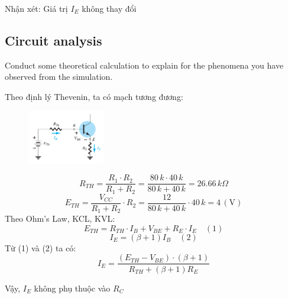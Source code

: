 Nhận xét: Giá trị $I_E$ không thay đổi
\subsection{Circuit analysis}
Conduct some theoretical calculation to explain for the phenomena you have observed
from the simulation.

Theo định lý Thevenin, ta có mạch tương đương:
\begin{figure}[h]
    \centering
    \includegraphics[width=0.3\textwidth]{graphics/ex5/f4.PNG}
\end{figure}

\pagebreak
\[
R_{TH} = \frac{R_1 \cdot R_2}{R_1 + R_2} = \frac{80\,k \cdot 40\,k}{80\,k + 40\,k} = 26.66 \, k\Omega
\]
\[
E_{TH} = \frac{V_{CC}}{R_1 + R_2} \cdot R_2 = \frac{12}{80\,k + 40\,k} \cdot 40\,k = 4 \, (\text{V})
\]
Theo Ohm's Law, KCL, KVL:
\[
E_{TH} = R_{TH} \cdot I_B + V_{BE} + R_E \cdot I_E \quad (1)
\]
\[
I_E = (\beta + 1) I_B \quad (2)
\]
Từ (1) và (2) ta có:
\[
I_E = \frac{(E_{TH} - V_{BE}) \cdot (\beta + 1)}{R_{TH} + (\beta + 1) R_E}
\]

Vậy, $I_E$ không phụ thuộc vào $R_C$ 